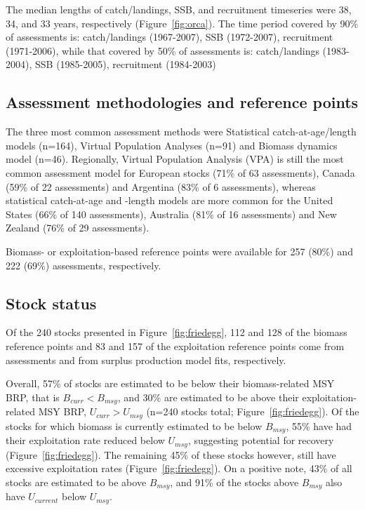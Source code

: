 The median lengths of catch/landings, SSB, and recruitment timeseries
were 38, 34, and 33
years, respectively (Figure~\ref{fig:orca}).  The time period covered by 90\% of assessments
is: catch/landings (1967-2007), SSB
(1972-2007), recruitment (1971-2006), while that
covered by 50\% of assessments is: catch/landings
(1983-2004), SSB (1985-2005), recruitment
(1984-2003)
 
\subsection*{Assessment methodologies and reference points}
\noindent
The three most common assessment methods were
Statistical catch-at-age/length models (n=164), Virtual Population Analyses (n=91) and
Biomass dynamics model (n=46). Regionally, Virtual Population Analysis
(VPA) is still the most common assessment model for European stocks
(71\% of 63 assessments),
Canada (59\% of 22
assessments) and Argentina (83\% of
6 assessments), whereas statistical catch-at-age
and -length models are more common for the United States
(66\% of 140 assessments),
Australia (81\% of 16
assessments) and New Zealand (76\% of
29 assessments).

Biomass- or exploitation-based reference points were available for
257 (80\%) and
222 (69\%)
assessments, respectively.

\subsection*{Stock status}
\noindent
Of the
240 stocks presented in
Figure~\ref{fig:friedegg}, 112 and
128 of the biomass reference points and
83 and
157 of the exploitation reference
points come from assessments and from surplus production model fits,
respectively.

Overall, 57\% of stocks are estimated
to be below their biomass-related MSY BRP, that is $B_{curr}<B_{msy}$,
and 30\% are estimated to be above
their exploitation-related MSY BRP, $U_{curr}>U_{msy}$
(n=240 stocks total; Figure~\ref{fig:friedegg}).
Of the stocks for which biomass is currently estimated to be below
$B_{msy}$, 55\% have had their
exploitation rate reduced below $U_{msy}$, suggesting potential for
recovery (Figure~\ref{fig:friedegg}). The remaining
45\% of these stocks however,
still have excessive exploitation rates (Figure~\ref{fig:friedegg}).
On a positive note, 43\% of all stocks are
estimated to be above $B_{msy}$, and
91\% of the stocks above
$B_{msy}$ also have $U_{current}$ below $U_{msy}$.
